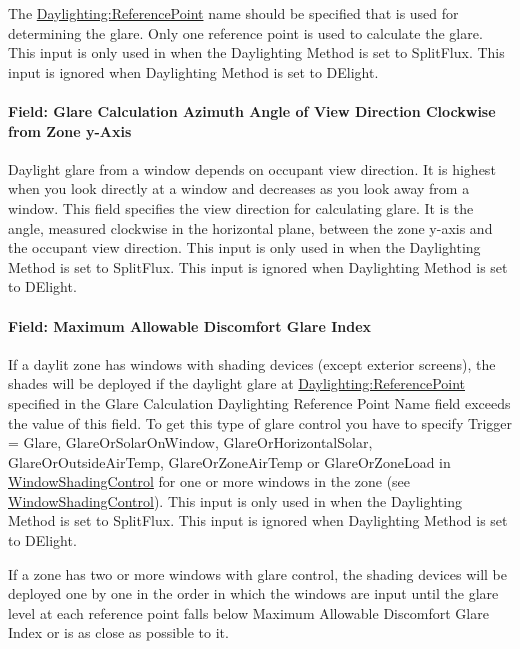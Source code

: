The \hyperref[daylightingreferencepoint-000]{Daylighting:ReferencePoint} name should be specified that is used for determining the glare. Only one reference point is used to calculate the glare. This input is only used in when the Daylighting Method is set to SplitFlux. This input is ignored when Daylighting Method is set to DElight.

\paragraph{Field: Glare Calculation Azimuth Angle of View Direction Clockwise from Zone y-Axis}\label{field-glare-calculation-azimuth-angle-of-view-direction-clockwise-from-zone-y-axis}

Daylight glare from a window depends on occupant view direction. It is highest when you look directly at a window and decreases as you look away from a window. This field specifies the view direction for calculating glare. It is the angle, measured clockwise in the horizontal plane, between the zone y-axis and the occupant view direction. This input is only used in when the Daylighting Method is set to SplitFlux. This input is ignored when Daylighting Method is set to DElight.

\paragraph{Field: Maximum Allowable Discomfort Glare Index}\label{field-maximum-allowable-discomfort-glare-index}

If a daylit zone has windows with shading devices (except exterior screens), the shades will be deployed if the daylight glare at \hyperref[daylightingreferencepoint-000]{Daylighting:ReferencePoint} specified in the Glare Calculation Daylighting Reference Point Name field exceeds the value of this field. To get this type of glare control you have to specify Trigger = Glare, GlareOrSolarOnWindow, GlareOrHorizontalSolar, GlareOrOutsideAirTemp, GlareOrZoneAirTemp or GlareOrZoneLoad in \hyperref[windowpropertyshadingcontrol]{WindowShadingControl} for one or more windows in the zone (see \hyperref[windowpropertyshadingcontrol]{WindowShadingControl}). This input is only used in when the Daylighting Method is set to SplitFlux. This input is ignored when Daylighting Method is set to DElight.

If a zone has two or more windows with glare control, the shading devices will be deployed one by one in the order in which the windows are input until the glare level at each reference point falls below Maximum Allowable Discomfort Glare Index or is as close as possible to it.

